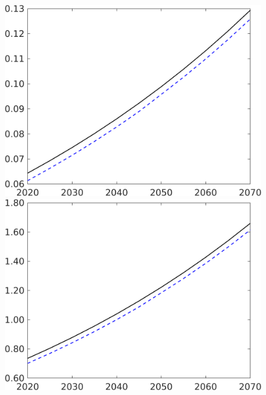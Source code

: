 \begin{figure}[h!!]
\begin{minipage}[]{0.32\textwidth}
\end{minipage}
\begin{minipage}[]{0.32\textwidth}
	\includegraphics[width=1\textwidth]{../../codding_model/own_basedOnFried/optimalPol_190722_tidiedUp/figures/all_10Aout22/CountTaul_modtest_target_wsn_spillover0_sep1_extern0_PV1_etaa0.79_lgd0.png}
\end{minipage}
\begin{minipage}[]{0.32\textwidth}
	\includegraphics[width=1\textwidth]{../../codding_model/own_basedOnFried/optimalPol_190722_tidiedUp/figures/all_10Aout22/CountTaul_modtest_target_C_spillover0_sep1_extern0_PV1_etaa0.79_lgd0.png}

\end{minipage}
\end{figure}
